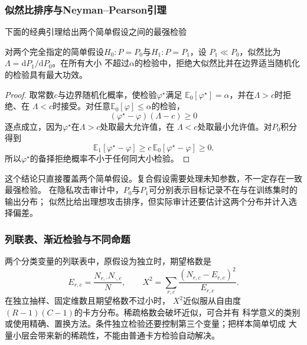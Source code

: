 \subsubsection{似然比排序与Neyman–Pearson引理}

下面的经典引理给出两个简单假设之间的最强检验
\begin{theorem}
\label{thm:statistics-neyman-pearson}
对两个完全指定的简单假设\(H_0:P=P_0\)与\(H_1:P=P_1\)，设
\(P_1\ll P_0\)，似然比为\(\Lambda=\mathrm dP_1/\mathrm dP_0\)。在所有大小
不超过\(\alpha\)的检验中，拒绝大似然比并在边界适当随机化的检验具有最大功效。
\end{theorem}

\begin{proof}
取常数\(c\)与边界随机化概率，使检验\(\varphi^\star\)满足
\(\mathbb{E}_0[\varphi^\star]=\alpha\)，并在\(\Lambda>c\)时拒绝、在
\(\Lambda<c\)时接受。对任意\(\mathbb{E}_0[\varphi]\leq\alpha\)的检验，
\[
  (\varphi^\star-\varphi)(\Lambda-c)\geq0
\]
逐点成立，因为\(\varphi^\star\)在\(\Lambda>c\)处取最大允许值，在
\(\Lambda<c\)处取最小允许值。对\(P_0\)积分得到
\[
  \mathbb{E}_1[\varphi^\star-\varphi]
  \geq c\,\mathbb{E}_0[\varphi^\star-\varphi]\geq0.
\]
所以\(\varphi^\star\)的备择拒绝概率不小于任何同大小检验。
\end{proof}

这个结论只直接覆盖两个简单假设。复合假设需要处理未知参数，不一定存在一致最强检验。
在隐私攻击审计中，\(P_0\)与\(P_1\)可分别表示目标记录不在与在训练集时的输出分布；
似然比给出理想攻击排序，但实际审计还要估计这两个分布并计入选择偏差。

\subsubsection{列联表、渐近检验与不同命题}

两个分类变量的列联表中，原假设为独立时，期望格数是
\[
  E_{r,c}=\frac{N_{r,\cdot}N_{\cdot,c}}{N},\qquad
  X^2=\sum_{r,c}\frac{(N_{r,c}-E_{r,c})^2}{E_{r,c}}.
\]
在独立抽样、固定维数且期望格数不过小时，
\(X^2\)近似服从自由度\((R-1)(C-1)\)的卡方分布。稀疏格数会破坏近似，可合并有
科学意义的类别或使用精确、置换方法。条件独立检验还要控制第三个变量；把样本简单切成
大量小层会带来新的稀疏性，不能由普通卡方检验自动解决。

